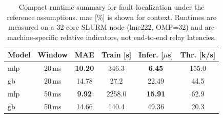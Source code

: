 \begin{table}[ht]
\caption{Compact runtime summary for fault localization under the reference assumptions. \ac{mae} [\%] is shown for context. Runtimes are measured on a 32-core SLURM node (lme222, OMP=32) and are machine-specific relative indicators, not end-to-end relay latencies.}
\label{tab:fl_runtime_compact}
\centering
\small
\begin{tabular}{lccccc}
\toprule
\textbf{Model} & \textbf{Window} & \textbf{MAE} & \textbf{Train [s]} & \textbf{Infer. [$\mu$s]} & \textbf{Thr. [k/s]} \\
\midrule
\ac{mlp} & 20\,ms & \textbf{10.20} & 346.3 & \textbf{6.45} & 155.0 \\
\ac{gb} & 20\,ms & 14.78 & 27.2 & 22.49 & 44.5 \\
\midrule
\ac{mlp} & 50\,ms & \textbf{9.92} & 2258.0 & \textbf{15.91} & 62.9 \\
\ac{gb} & 50\,ms & 14.66 & 140.4 & 49.36 & 20.3 \\
\bottomrule
\end{tabular}
\end{table}
